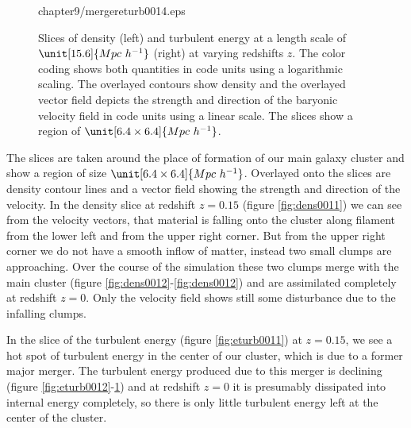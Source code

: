 \begin{figure}[tp]
{{chapter9/mergereturb0014.eps}
\label{fig:eturb0014}}
\caption{Slices of density (left) and turbulent energy at a length scale of
$\unit[15.6] {Mpc\ h^{-1}}$ (right) at varying redshifts $z$. The color coding
shows both quantities in code units using a logarithmic scaling. The overlayed
contours show density and the overlayed vector field depicts the strength and
direction of the baryonic velocity field in code units using a linear scale. The
slices show a region of $\unit[6.4 \times 6.4] {Mpc\ h^{-1}}$. }
\end{figure}
The slices are taken around the place of
formation of our main galaxy cluster and show a region of size 
$\unit[6.4 \times 6.4] {Mpc\ h^{-1}}$. Overlayed onto the slices are density
contour lines and a vector field showing the strength and direction of
the velocity. In the density slice at redshift $z=0.15$
(figure \ref{fig:dens0011}) we can see from the velocity vectors, that material
is falling onto the cluster along filament from the lower left and from the
upper right corner. But from the upper right corner we do not have a smooth
inflow of matter, instead two small clumps are approaching. Over the course of
the simulation these two clumps merge with the main cluster
(figure \ref{fig:dens0012}-\ref{fig:dens0012}) and are assimilated completely
at redshift $z=0$. Only the velocity field shows still some disturbance due to
the infalling clumps.  

In the slice of the turbulent energy (figure \ref{fig:eturb0011}) at $z=0.15$,
we see a hot spot of turbulent energy in the center of our cluster, which is due
to a former major merger. The turbulent energy produced due to this merger is
declining (figure \ref{fig:eturb0012}-\ref{fig:eturb0014}) and at redshift
$z=0$ it is presumably dissipated into internal energy completely, so there
is only little turbulent energy left at the center of the cluster. 

